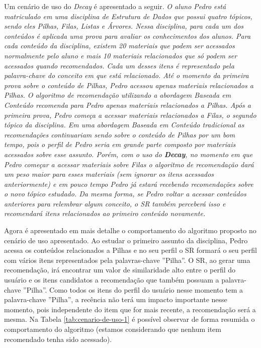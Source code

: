 Um cenário de uso do \textit{Decay} é apresentado a seguir. \textit{O aluno Pedro está matriculado em uma disciplina de Estrutura de Dados
que possui quatro tópicos, sendo eles Pilhas, Filas, Listas e Árvores. Nessa disciplina, para cada um dos conteúdos é
aplicada uma prova para avaliar os conhecimentos dos alunos. Para cada conteúdo da disciplina, existem 20 materiais que podem
ser acessados normalmente pelo aluno e mais 10 materiais relacionados que só podem ser acessados quando recomendados.
Cada um desses itens é representado pela palavra-chave do conceito em que está relacionado. Até o momento da primeira prova sobre o conteúdo de Pilhas,
Pedro acessou apenas materiais relacionados a Pilhas. O algoritmo de recomendação utilizando a abordagem Baseada em
Conteúdo recomenda para Pedro apenas materiais relacionados a Pilhas. Após a primeira prova, Pedro começa a acessar
materiais relacionados a Filas, o segundo tópico da disciplina. Em uma abordagem Baseada em Conteúdo tradicional as
recomendações continuariam sendo sobre o conteúdo de Pilhas por um bom tempo, pois o perfil de Pedro seria em grande
parte composto por materiais acessados sobre esse assunto. Porém, com o uso do \textbf{Decay}, no momento em que Pedro começar a
acessar materiais sobre Filas o algoritmo de recomendação dará um peso maior para esses materiais (sem ignorar os itens
acessados anteriormente) e em pouco tempo Pedro já estará recebendo recomendações sobre o novo tópico estudado. Da mesma
forma, se Pedro voltar a acessar conteúdos anteriores para relembrar algum conceito, o SR também perceberá isso e
recomendará itens relacionados ao primeiro conteúdo novamente.}

Agora é apresentado em mais detalhe o comportamento do algoritmo proposto no cenário de uso apresentado.
Ao estudar o primeiro assunto da disciplina, Pedro acessa os conteúdos relacionados a Pilhas e no seu perfil
o SR formará o seu perfil com vários itens representados pela palavras-chave ''Pilha''. O SR, ao gerar uma recomendação,
irá encontrar um valor de similaridade alto entre o perfil do usuário e os itens candidatos a recomendação que também possuam
a palavra-chave ''Pilha''. Como todos os itens do perfil do usuário nesse momento tem a palavra-chave ''Pilha'', a recência não
terá um impacto importante nesse momento, pois independente do item que for mais recente, a recomendação será a mesma. Na
Tabela \ref{tab:cenario-de-uso-1} é possível observar de forma resumida o comportamento do algoritmo (estamos considerando
que nenhum item recomendado tenha sido acessado).

